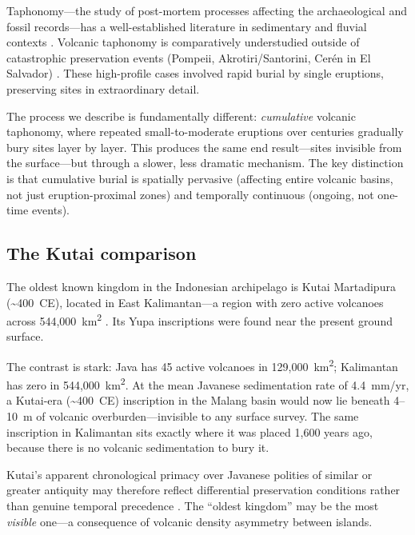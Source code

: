 \documentclass[12pt,a4paper]{article}
\begin{document}
Taphonomy---the study of post-mortem processes affecting the archaeological and fossil records---has a well-established literature in sedimentary and fluvial contexts \citep{schiffer1987}. Volcanic taphonomy is comparatively understudied outside of catastrophic preservation events (Pompeii, Akrotiri/Santorini, Cer\'{e}n in El Salvador) \citep{sigurdsson1985,doumas1983,sheets1992}. These high-profile cases involved rapid burial by single eruptions, preserving sites in extraordinary detail.

The process we describe is fundamentally different: \textit{cumulative} volcanic taphonomy, where repeated small-to-moderate eruptions over centuries gradually bury sites layer by layer. This produces the same end result---sites invisible from the surface---but through a slower, less dramatic mechanism. The key distinction is that cumulative burial is spatially pervasive (affecting entire volcanic basins, not just eruption-proximal zones) and temporally continuous (ongoing, not one-time events).

\subsection{The Kutai comparison}

The oldest known kingdom in the Indonesian archipelago is Kutai Martadipura (\textasciitilde400~CE), located in East Kalimantan---a region with zero active volcanoes across 544,000~km\textsuperscript{2} \citep{vogel1918}. Its Yupa inscriptions were found near the present ground surface.

The contrast is stark: Java has 45 active volcanoes in 129,000~km\textsuperscript{2}; Kalimantan has zero in 544,000~km\textsuperscript{2}. At the mean Javanese sedimentation rate of 4.4~mm/yr, a Kutai-era (\textasciitilde400~CE) inscription in the Malang basin would now lie beneath 4--10~m of volcanic overburden---invisible to any surface survey. The same inscription in Kalimantan sits exactly where it was placed 1,600 years ago, because there is no volcanic sedimentation to bury it.

Kutai's apparent chronological primacy over Javanese polities of similar or greater antiquity may therefore reflect differential preservation conditions rather than genuine temporal precedence \citep{coedes1968,miksic2004}. The ``oldest kingdom'' may be the most \textit{visible} one---a consequence of volcanic density asymmetry between islands.

\end{document}

